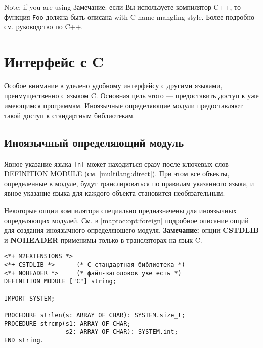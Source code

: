 Note: if you are using 
Замечание: если Вы используете компилятор C++, то функция {\tt Foo} 
должна быть описана
with C name mangling style. %
Более подробно см. руководство по C++.


\section{Интерфейс с C}\label{multilang:C}

Особое внимание в \XDS{} уделено удобному интерфейсу с другими языками,
преимущественно с языком C. Основная цель этого --- предоставить доступ
к уже имеющимся программам.
Иноязычные определяющие модули предоставляют такой доступ к
стандартным библиотекам.

\subsection{Иноязычный определяющий модуль}

Явное указание языка \verb|[n]| может находиться сразу после 
ключевых слов
DEFINITION MODULE (см. \ref{multilang:direct}). 
При этом все объекты, определенные в модуле, будут транслироваться 
по правилам указанного языка, и явное указание языка для каждого
объекта становится необязательным.

Некоторые опции компилятора специально предназначены для 
иноязычных определяющих модулей.
\ifgenc
См. в \ref{maptoc:opt:foreign} 
подробное описание опций для создания иноязычного
определяющего модуля.
\fi
\ifgencode
{\bf Замечание:} опции {\bf CSTDLIB} и {\bf NOHEADER} 
применимы только в трансляторах на язык C.
\fi

\Example
\begin{verbatim}
<*+ M2EXTENSIONS *>
<*+ CSTDLIB *>      (* C стандартная библиотека *)
<*+ NOHEADER *>     (* файл-заголовок уже есть *)
DEFINITION MODULE ["C"] string;

IMPORT SYSTEM;

PROCEDURE strlen(s: ARRAY OF CHAR): SYSTEM.size_t;
PROCEDURE strcmp(s1: ARRAY OF CHAR;
                 s2: ARRAY OF CHAR): SYSTEM.int;
END string.
\end{verbatim}

